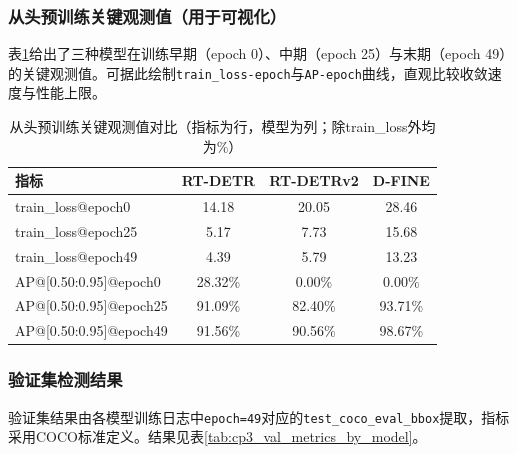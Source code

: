 \subsubsection{从头预训练关键观测值（用于可视化）}

表\ref{tab:cp3_obs_metrics_by_model}给出了三种模型在训练早期（epoch 0）、中期（epoch 25）与末期（epoch 49）的关键观测值。可据此绘制\texttt{train\_loss-epoch}与\texttt{AP-epoch}曲线，直观比较收敛速度与性能上限。

\begin{table}[h]
    \centering
    \caption{从头预训练关键观测值对比（指标为行，模型为列；除train\_loss外均为\%）}
    \label{tab:cp3_obs_metrics_by_model}
    \begin{tabular}{lccc}
        \hline
        \textbf{指标}            & \textbf{RT-DETR} & \textbf{RT-DETRv2} & \textbf{D-FINE} \\ \hline
        train\_loss@epoch0     & 14.18            & 20.05              & 28.46           \\
        train\_loss@epoch25    & 5.17             & 7.73               & 15.68           \\
        train\_loss@epoch49    & 4.39             & 5.79               & 13.23           \\
        AP@[0.50:0.95]@epoch0  & 28.32\%          & 0.00\%             & 0.00\%          \\
        AP@[0.50:0.95]@epoch25 & 91.09\%          & 82.40\%            & 93.71\%         \\
        AP@[0.50:0.95]@epoch49 & 91.56\%          & 90.56\%            & 98.67\%         \\ \hline
    \end{tabular}
\end{table}

\subsubsection{验证集检测结果}

验证集结果由各模型训练日志中\texttt{epoch=49}对应的\texttt{test\_coco\_eval\_bbox}提取，指标采用COCO标准定义。结果见表\ref{tab:cp3_val_metrics_by_model}。

